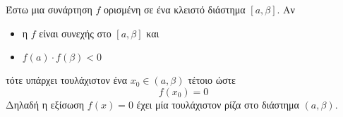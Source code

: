 Έστω μια συνάρτηση $ f $ ορισμένη σε ένα κλειστό διάστημα $ [a,\beta] $. Αν
\begin{itemize}
\item η $ f $ είναι συνεχής στο $ [a,\beta] $ και
\item $ f(a)\cdot f(\beta)<0 $
\end{itemize}
τότε υπάρχει τουλάχιστον ένα $ x_0\in(a,\beta) $ τέτοιο ώστε 
\[ f(x_0)=0 \]
Δηλαδή η εξίσωση $ f(x)=0 $ έχει μία τουλάχιστον ρίζα στο διάστημα $ (a,\beta) $.
